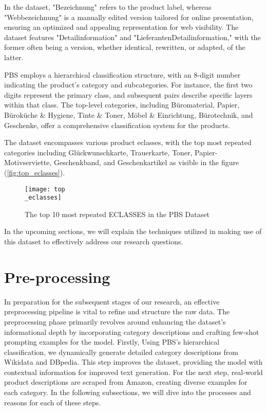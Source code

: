 In the dataset, "Bezeichnung" refers to the product label, whereas "Webbezeichnung" is a manually edited version tailored for online presentation, ensuring an optimized and appealing representation for web visibility. The dataset features "Detailinformation" and "LieferantenDetailinformation," with the former often being a version, whether identical, rewritten, or adapted, of the latter.


PBS employs a hierarchical classification structure, with an 8-digit number indicating the product's category and subcategories. For instance, the first two digits represent the primary class, and subsequent pairs describe specific layers within that class. The top-level categories, including Büromaterial, Papier, Büroküche \& Hygiene, Tinte \& Toner, Möbel \& Einrichtung, Bürotechnik, and Geschenke, offer a comprehensive classification system for the products.

The dataset encompasses various product eclasses, with the top most repeated categories including Glückwunschkarte, Trauerkarte, Toner, Papier-Motivserviette, Geschenkband, and Geschenkartikel as visible in the figure (\autoref{fig:top_eclasses}).

\begin{figure}[H]
	\centering
	\texttt{[image: top\\\_eclasses]}
	\caption{The top 10 most repeated ECLASSES in the PBS Dataset}
	\label{fig:top_eclasses}
\end{figure}

In the upcoming sections, we will explain the techniques utilized in making use of this dataset to effectively address our research questions.


\section{Pre-processing}

In preparation for the subsequent stages of our research, an effective preprocessing pipeline is vital to refine and structure the raw data. The preprocessing phase primarily revolves around enhancing the dataset's informational depth by incorporating category descriptions and crafting few-shot prompting examples for the model. Firstly, Using PBS's hierarchical classification, we dynamically generate detailed category descriptions from Wikidata and DBpedia. This step improves the dataset, providing the model with contextual information for improved text generation. For the next step, real-world product descriptions are scraped from Amazon, creating diverse examples for each category. In the following subsections, we will dive into the processes and reasons for each of these steps.

